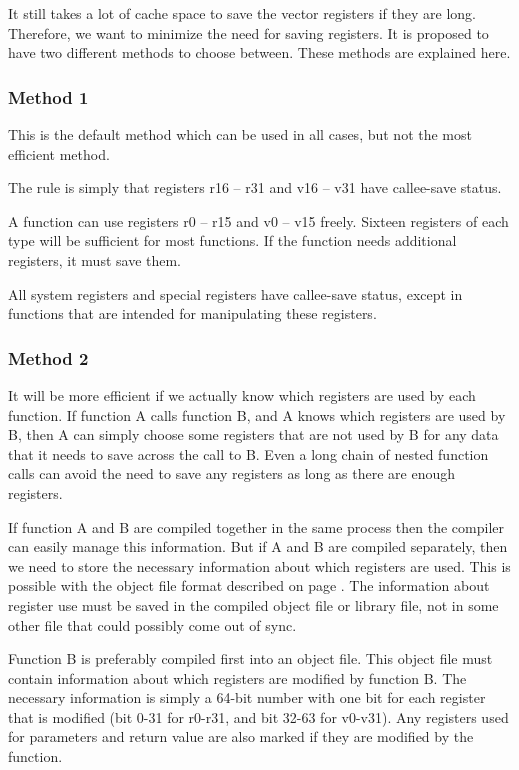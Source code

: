\documentclass[forwardcom.tex]{subfiles}
\begin{document}
It still takes a lot of cache space to save the vector registers if they are long. Therefore, we want to minimize the need for saving registers. It is proposed to have two different methods to choose between. These methods are explained here. 

\subsubsection{Method 1}
This is the default method which can be used in all cases, but not the most efficient method. 
\vspace{2mm}

The rule is simply that registers r16 – r31 and v16 – v31 have callee-save status.
\vspace{2mm}

A function can use registers r0 – r15 and v0 – v15 freely. Sixteen registers of each type will be sufficient for most functions. If the function needs additional registers, it must save them. 
\vspace{2mm}

All system registers and special registers have callee-save status, except in functions that are intended for manipulating these registers.

\subsubsection{Method 2}
It will be more efficient if we actually know which registers are used by each function. If function A calls function B, and A knows which registers are used by B, then A can simply choose some registers that are not used by B for any data that it needs to save across the call to B. Even a long chain of nested function calls can avoid the need to save any registers as long as there are enough registers. 
\vspace{2mm}

If function A and B are compiled together in the same process then the compiler can easily manage this information. But if A and B are compiled separately, then we need to store the necessary information about which registers are used. This is possible with the object file format described on page \pageref{objectFileFormat}. The information about register use must be saved in the compiled object file or library file, not in some other file that could possibly come out of sync. 
\vspace{2mm}

Function B is preferably compiled first into an object file. This object file must contain information about which registers are modified by function B. The necessary information is simply a 64-bit number with one bit for each register that is modified (bit 0-31 for r0-r31, and bit 32-63 for v0-v31). Any registers used for parameters and return value are also marked if they are modified by the function.
\vspace{2mm}
\end{document}

